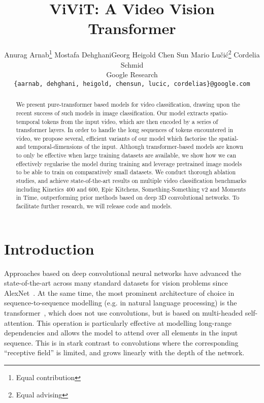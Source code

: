 \documentclass[10pt,twocolumn,letterpaper]{article}
\begin{document}
\title{\vspace{-\baselineskip} ViViT: A Video Vision Transformer}

\author{Anurag Arnab\thanks{Equal contribution} \quad Mostafa Dehghani\footnotemark[1] \quad Georg Heigold \quad Chen Sun \quad Mario Lučić\thanks{Equal advising}  \quad  Cordelia Schmid\footnotemark[2] \\
Google Research \\
{\tt\small \{aarnab, dehghani, heigold, chensun, lucic, cordelias\}@google.com}
}

\maketitle
\ificcvfinal\thispagestyle{empty}\fi

\begin{abstract}
	
We present pure-transformer based models for video classification, drawing upon the recent success of such models in image classification.
Our model extracts spatio-temporal tokens from the input video, which are then encoded by a series of transformer layers.
In order to handle the long sequences of tokens encountered in video, we propose several, efficient variants of our model which factorise the spatial- and temporal-dimensions of the input. Although transformer-based models are known to only be effective when large training datasets are available, we show how we can effectively regularise the model during training and leverage pretrained image models to be able to train on comparatively small datasets.
We conduct thorough ablation studies, and achieve state-of-the-art results on multiple video classification benchmarks including Kinetics 400 and 600, Epic Kitchens, Something-Something v2 and Moments in Time, outperforming prior methods based on deep 3D convolutional networks.
To facilitate further research, we will release code and models.



\end{abstract} 

\section{Introduction}


Approaches based on deep convolutional neural networks have advanced the state-of-the-art across many standard datasets for vision problems since AlexNet~\cite{krizhevsky_neurips_2012}.
At the same time, the most prominent architecture of choice in sequence-to-sequence modelling (e.g. in natural language processing) is the transformer~\cite{vaswani_neurips_2017}, which does not use convolutions, but is based on multi-headed self-attention.
This operation is particularly effective at modelling long-range dependencies and allows the model to attend over all elements in the input sequence.
This is in stark contrast to convolutions where the corresponding ``receptive field'' is limited, and grows linearly with the depth of the network.
\end{document}
